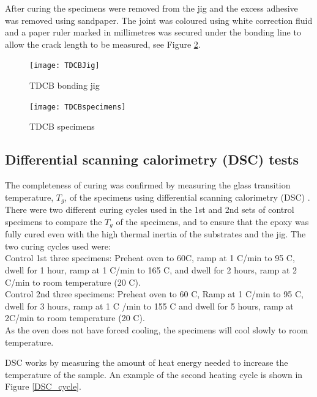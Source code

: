 \documentclass[numbers=noendperiod,chapterprefix=on]{icldt} %
\begin{document}
After curing the specimens were removed from the jig and the excess adhesive was removed using sandpaper. The joint was coloured using white correction fluid and a paper ruler marked in millimetres was secured under the bonding line to allow the crack length to be measured, see Figure \ref{TDCBspecimens}.


\begin{figure}[!htpb]
\centering
\texttt{[image: TDCBJig]}
\caption{TDCB bonding jig} \label{TDCBJig}
\end{figure}
\FloatBarrier
\begin{figure}[!htpb]
\centering
\texttt{[image: TDCBspecimens]}
\caption{TDCB specimens} \label{TDCBspecimens}
\end{figure}
\FloatBarrier
\subsection{Differential scanning calorimetry (DSC) tests} \label{DCS}
The completeness of curing was confirmed by measuring the glass transition temperature, $ T_{g} $, of the specimens using differential scanning calorimetry (DSC) \cite{BlackmanB.R.K.2009}. There were two different curing cycles used in the 1st and 2nd sets of control specimens to compare the $ T_{g} $ of the specimens, and to ensure that the epoxy was fully cured even with the high thermal inertia of the substrates and the jig.
The two curing cycles used were:
\\
Control 1st three specimens: Preheat oven to 60\degree C, ramp at 1 \degree C/min to 95 \degree C, dwell for 1 hour, ramp at 1 \degree C/min to 165 \degree C, and dwell for 2 hours, ramp at 2 \degree C/min to room temperature (20 \degree C).  
\\
Control 2nd three specimens: Preheat oven to 60 \degree C, Ramp at 1 \degree C/min to 95 \degree C, dwell for 3 hours, ramp at 1 \degree C /min to 155 \degree C and dwell for 5 hours, ramp at 2\degree C/min to room temperature (20 \degree C). 
\\
As the oven does not have forced cooling, the specimens will cool slowly to room temperature.

DSC works by measuring the amount of heat energy needed to increase the temperature of the sample. An example of the second heating cycle is shown in Figure \ref{DSC_cycle}.
\end{document}
